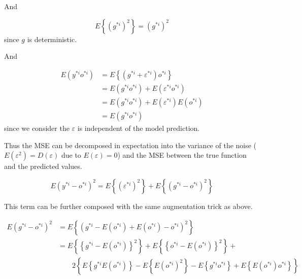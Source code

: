 \documentclass[runningheads,openany]{xhlPaper}
\begin{document}
And

\begin{displaymath}
E\left \{ \left ( g^{*i} \right )^2 \right \}=\left ( g^{*i} \right )^2
\end{displaymath}
since $g$ is deterministic.

And

\begin{displaymath}
\begin{aligned}
E\left ( y^{*i}o^{*i} \right )&=E\left \{ \left ( g^{*i}+\varepsilon^{*i} \right )o^{*i} \right \}\\
&=E\left (g^{*i}o^{*i} \right )+E\left ( \varepsilon^{*i} o^{*i} \right )\\
&=E\left (g^{*i}o^{*i} \right )+E\left ( \varepsilon^{*i} \right )E\left ( o^{*i} \right )\\
&=E\left (g^{*i}o^{*i} \right )
\end{aligned}
\end{displaymath}
since we consider the $\varepsilon$ is independent of the model prediction.

Thus the MSE can be decomposed in expectation into the variance of the noise ($E\left ( \varepsilon^2  \right ) = D\left ( \varepsilon  \right )$ due to $E\left ( \varepsilon  \right )=0$) and the MSE between the true function and the predicted values.

\begin{displaymath}
E\left ( y^{*i}-o^{*i} \right )^2 = E\left \{ \left(\varepsilon^{*i}\right)^2  \right \} +E\left \{\left ( g^{*i}-o^{*i} \right )^2\right \}
\end{displaymath}

This term can be further composed with the same augmentation trick as above.

\begin{displaymath}
\begin{aligned}
E\left ( g^{*i}-o^{*i} \right )^2 &= E\left \{\left ( g^{*i} - E\left ( o^{*i} \right )+E\left ( o^{*i} \right ) - o^{*i}\right )^2 \right \}\\
&=E\left \{ \left \{ g^{*i} - E\left ( o^{*i} \right ) \right \}^2 \right \}+E\left \{ \left \{ o^{*i} - E\left ( o^{*i} \right ) \right \}^2 \right \}+\\
&\quad\quad 2\left \{ E\left \{ g^{*i}E\left ( o^{*i} \right ) \right \} - E\left \{ E\left ( o^{*i} \right )^2 \right \} - E\left \{ g^{*i}o^{*i} \right \}+ E\left \{ E\left ( o^{*i} \right )o^{*i} \right \}\right \}
\end{aligned}
\end{displaymath}
\end{document}
